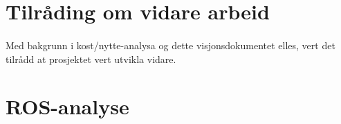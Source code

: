 \documentclass[nynorsk,12pt,a4paper]{article}
\begin{document}
\newpage
\section{Tilråding om vidare arbeid}
\paragraph{}
Med bakgrunn i kost/nytte-analysa og dette visjonsdokumentet elles, vert det tilrådd at prosjektet vert utvikla vidare. 

\newpage

\appendix
\section{ROS-analyse}


\end{document}
